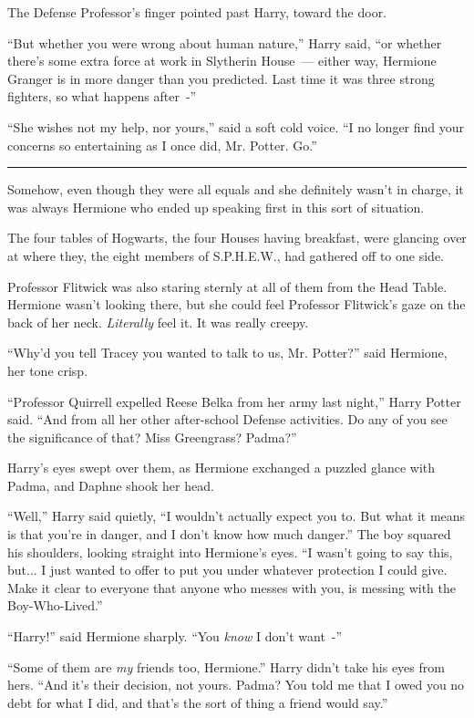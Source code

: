 The Defense Professor's finger pointed past Harry, toward the door.

``But whether you were wrong about human nature,'' Harry said, ``or whether there's some extra force at work in Slytherin House~--- either way, Hermione Granger is in more danger than you predicted. Last time it was three strong fighters, so what happens after~-''

``She wishes not my help, nor yours,'' said a soft cold voice. ``I no longer find your concerns so entertaining as I once did, Mr. Potter. Go.''

\begin{center}\rule{3in}{0.4pt}\end{center}

Somehow, even though they were all equals and she definitely wasn't in charge, it was always Hermione who ended up speaking first in this sort of situation.

The four tables of Hogwarts, the four Houses having breakfast, were glancing over at where they, the eight members of S.P.H.E.W., had gathered off to one side.

Professor Flitwick was also staring sternly at all of them from the Head Table. Hermione wasn't looking there, but she could feel Professor Flitwick's gaze on the back of her neck. \emph{Literally} feel it. It was really creepy.

``Why'd you tell Tracey you wanted to talk to us, Mr. Potter?'' said Hermione, her tone crisp.

``Professor Quirrell expelled Reese Belka from her army last night,'' Harry Potter said. ``And from all her other after-school Defense activities. Do any of you see the significance of that? Miss Greengrass? Padma?''

Harry's eyes swept over them, as Hermione exchanged a puzzled glance with Padma, and Daphne shook her head.

``Well,'' Harry said quietly, ``I wouldn't actually expect you to. But what it means is that you're in danger, and I don't know how much danger.'' The boy squared his shoulders, looking straight into Hermione's eyes. ``I wasn't going to say this, but... I just wanted to offer to put you under whatever protection I could give. Make it clear to everyone that anyone who messes with you, is messing with the Boy-Who-Lived.''

``Harry!'' said Hermione sharply. ``You \emph{know} I don't want~-''

``Some of them are \emph{my} friends too, Hermione.'' Harry didn't take his eyes from hers. ``And it's their decision, not yours. Padma? You told me that I owed you no debt for what I did, and that's the sort of thing a friend would say.''

